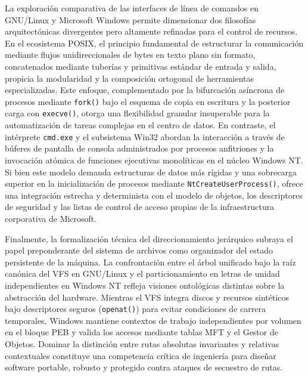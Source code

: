 \documentclass[12pt]{article}
\begin{document}
La exploración comparativa de las interfaces de línea de comandos en GNU/Linux y Microsoft Windows permite dimensionar dos filosofías arquitectónicas divergentes pero altamente refinadas para el control de recursos. En el ecosistema POSIX, el principio fundamental de estructurar la comunicación mediante flujos unidireccionales de bytes en texto plano sin formato, concatenados mediante tuberías y primitivas estándar de entrada y salida, propicia la modularidad y la composición ortogonal de herramientas especializadas. Este enfoque, complementado por la bifurcación asíncrona de procesos mediante \texttt{fork()} bajo el esquema de copia en escritura y la posterior carga con \texttt{execve()}, otorga una flexibilidad granular insuperable para la automatización de tareas complejas en el centro de datos. En contraste, el intérprete \texttt{cmd.exe} y el subsistema Win32 abordan la interacción a través de búferes de pantalla de consola administrados por procesos anfitriones y la invocación atómica de funciones ejecutivas monolíticas en el núcleo Windows NT. Si bien este modelo demanda estructuras de datos más rígidas y una sobrecarga superior en la inicialización de procesos mediante \texttt{NtCreateUserProcess()}, ofrece una integración estrecha y determinista con el modelo de objetos, los descriptores de seguridad y las listas de control de acceso propias de la infraestructura corporativa de Microsoft.

Finalmente, la formalización técnica del direccionamiento jerárquico subraya el papel preponderante del sistema de archivos como organizador del estado persistente de la máquina. La confrontación entre el árbol unificado bajo la raíz canónica del VFS en GNU/Linux y el particionamiento en letras de unidad independientes en Windows NT refleja visiones ontológicas distintas sobre la abstracción del hardware. Mientras el VFS integra discos y recursos sintéticos bajo descriptores seguros (\texttt{openat()}) para evitar condiciones de carrera temporales, Windows mantiene contextos de trabajo independientes por volumen en el bloque PEB y valida los accesos mediante tablas MFT y el Gestor de Objetos. Dominar la distinción entre rutas absolutas invariantes y relativas contextuales constituye una competencia crítica de ingeniería para diseñar software portable, robusto y protegido contra ataques de secuestro de rutas.

\nocite{*}
\renewcommand*{\bibfont}{\small}
\setlength{\bibitemsep}{0.2\parsep}
\printbibliography[heading=bibintoc, title={Referencias}]
\end{document}
